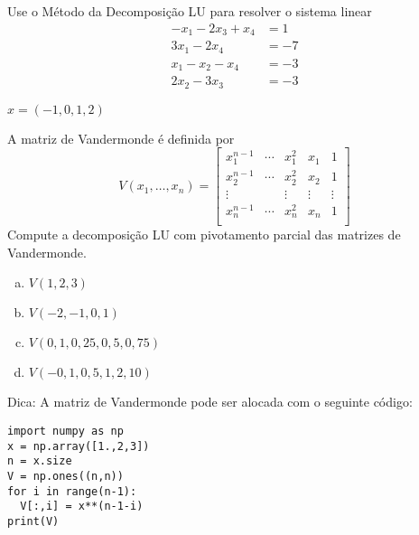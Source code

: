 \begin{exer}
  Use o Método da Decomposição LU para resolver o sistema linear
  \begin{align}
    -x_1 - 2x_3 + x_4 &= 1\\
    3x_1 - 2x_4 &= -7\\
    x_1 - x_2 - x_4 &= -3\\
    2x_2 - 3x_3 &= -3
  \end{align}
\end{exer}
\begin{resp}
  $x = (-1, 0, 1, 2)$
\end{resp}

\begin{exer}
  A matriz de Vandermonde{\vandermonde} é definida por
  \begin{equation}
    V(x_1,\ldots,x_n) =
    \begin{bmatrix}
      x_1^{n-1} & \cdots  & x_1^2 & x_1 & 1\\
      x_2^{n-1} & \cdots  & x_2^2 & x_2 & 1\\
      \vdots   &         & \vdots & \vdots & \vdots\\
      x_n^{n-1} & \cdots  & x_n^2 & x_n & 1\\
    \end{bmatrix}
  \end{equation}
  Compute a decomposição LU com pivotamento parcial das matrizes de Vandermonde.
  \begin{enumerate}[a)]
  \item $V(1,2,3)$\\
  \item $V(-2,-1,0,1)$\\
  \item $V(0,1, 0,25, 0,5, 0,75)$\\
  \item $V(-0,1, 0,5, 1, 2, 10)$
  \end{enumerate}
\end{exer}
\begin{resp}
  Dica: A matriz de Vandermonde pode ser alocada com o seguinte código:

\begin{lstlisting}
import numpy as np
x = np.array([1.,2,3])
n = x.size
V = np.ones((n,n))
for i in range(n-1):
  V[:,i] = x**(n-1-i)
print(V)
\end{lstlisting}

\end{resp}

